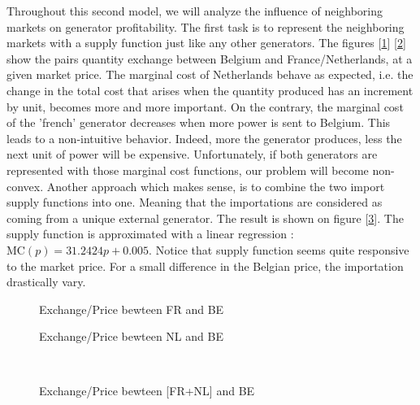 
Throughout this second model, we will analyze the influence of neighboring markets on generator profitability. The first task is to represent the neighboring markets with a supply function just like any other generators. The figures [\ref{fig:France}] [\ref{fig:Netherlands}] show the pairs quantity exchange between Belgium and France/Netherlands, at a given market price. The marginal cost of Netherlands behave as expected, i.e. the change in the total cost that arises when the quantity produced has an increment by unit, becomes more and more important. On the contrary, the marginal cost of the 'french' generator decreases when more power is sent to Belgium. This leads to a non-intuitive behavior. Indeed, more the generator produces, less the next unit of power will be expensive. Unfortunately, if both generators are represented with those marginal cost functions, our problem will become non-convex. Another approach which makes sense, is to combine the two import supply functions into one. Meaning that the importations are considered as coming from a unique external generator. The result is shown on figure [\ref{France_Netherlands}]. The supply function is approximated with a linear regression : $\text{MC}(p)= 31.2424 p + 0.005$. Notice that supply function seems quite responsive to the market price. For a small difference in the Belgian price, the importation drastically vary. \\

\vspace{0.5cm}

\begin{minipage}{0.495\textwidth} 
\begin{figure}[H]
    \centering
    \newlength\fheight 
    \newlength\fwidth 
    \setlength\fheight{4cm}
    \setlength{}
    
    \caption{Exchange/Price bewteen FR and BE}
    \label{fig:France}
\end{figure}
\end{minipage}
\begin{minipage}{0.495\textwidth} 
\begin{figure}[H]
    \centering
    \setlength\fheight{4cm}
    \setlength{}
    
    \caption{Exchange/Price bewteen NL and BE}
    \label{fig:Netherlands}
\end{figure}
\end{minipage} \\
\begin{figure}[H]
    \centering
    \setlength\fheight{4cm}
    \setlength{}
    
    \caption{Exchange/Price bewteen [FR+NL] and BE}
    \label{France_Netherlands}
\end{figure}

